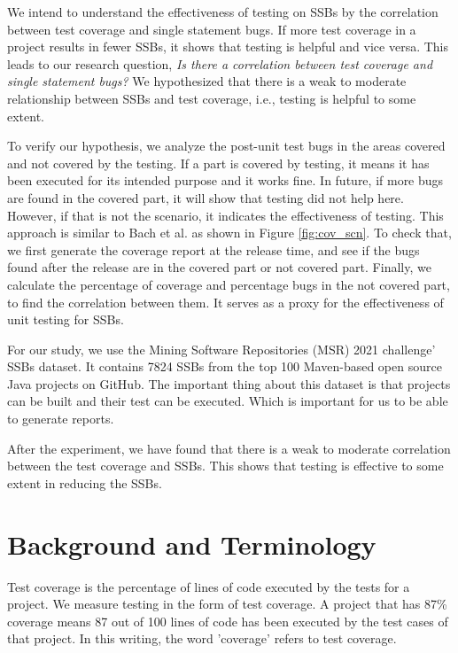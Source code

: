 \documentclass[sigconf,nonacm]{acmart}
\begin{document}
We intend to understand the effectiveness of testing on SSBs by the correlation between test coverage and single statement bugs. If more test coverage in a project results in fewer SSBs, it shows that testing is helpful and vice versa. This leads to our research question, \emph{Is there a correlation between test coverage and single statement bugs?} We hypothesized that there is a weak to moderate relationship between SSBs and test coverage, i.e., testing is helpful to some extent.

To verify our hypothesis, we analyze the post-unit test bugs in the areas covered and not covered by the testing. If a part is covered by testing, it means it has been executed for its intended purpose and it works fine. In future, if more bugs are found in the covered part, it will show that testing did not help here. However, if that is not the scenario, it indicates the effectiveness of testing. This approach is similar to Bach et al.\cite{similar} as shown in Figure \ref{fig:cov_scn}. To check that, we first generate the coverage report at the release time, and see if the bugs found after the release are in the covered part or not covered part. Finally, we calculate the percentage of coverage and percentage bugs in the not covered part, to find the correlation between them. It serves as a proxy for the effectiveness of unit testing for SSBs.

For our study, we use the Mining Software Repositories (MSR) 2021 challenge' SSBs dataset\cite{sstubs}. It contains 7824 SSBs from the top 100 Maven-based open source Java projects on GitHub. The important thing about this dataset is that projects can be built and their test can be executed. Which is important for us to be able to generate reports.

After the experiment, we have found that there is a weak to moderate correlation between the test coverage and SSBs. This shows that testing is effective to some extent in reducing the SSBs.



\section{Background and Terminology}
Test coverage is the percentage of lines of code executed by the tests for a project. We measure testing in the form of test coverage. A project that has 87\% coverage means 87 out of 100 lines of code has been executed by the test cases of that project. In this writing, the word 'coverage' refers to test coverage.
\end{document}
